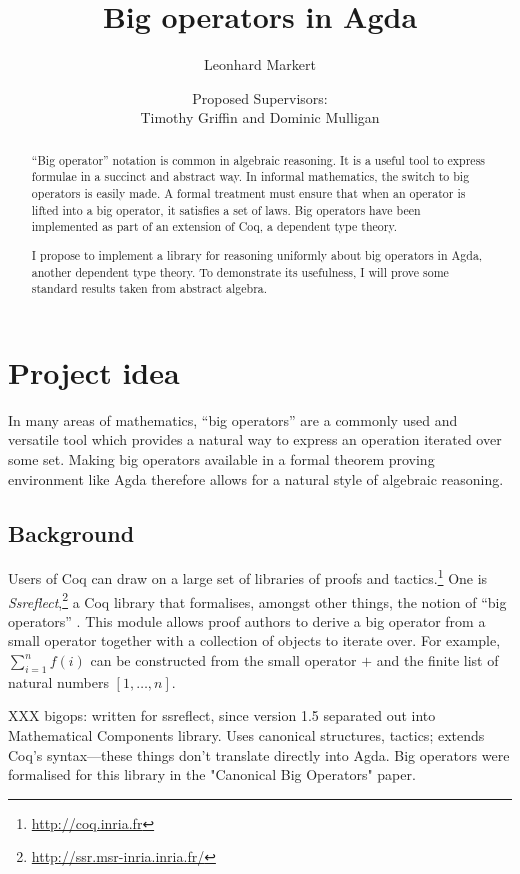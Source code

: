\documentclass[a4paper]{scrartcl}
\title{Big operators in Agda}
\author{Leonhard Markert}
\date{Proposed Supervisors:\\Timothy Griffin and Dominic Mulligan}
\begin{document}
\maketitle

\begin{abstract}
\enquote{Big operator} notation is common in algebraic reasoning.
It is a useful tool to express formulae in a succinct and abstract way.
In informal mathematics, the switch to big operators is easily made.
A formal treatment must ensure that when an operator is lifted into a big operator, it satisfies a set of laws.
Big operators have been implemented as part of an extension of Coq, a dependent type theory.

I propose to implement a library for reasoning uniformly about big operators in Agda, another dependent type theory.
To demonstrate its usefulness, I will prove some standard results taken from abstract algebra.
\end{abstract}

\section{Project idea}
\label{project-idea}

In many areas of mathematics, \enquote{big operators} are a commonly used and versatile tool which provides a natural way to express an operation iterated over some set. Making big operators available in a formal theorem proving environment like Agda therefore allows for a natural style of algebraic reasoning.

\subsection{Background}

Users of Coq can draw on a large set of libraries of proofs and tactics.\footnote{\url{http://coq.inria.fr}}
One is \emph{Ssreflect},\footnote{\url{http://ssr.msr-inria.inria.fr/}} a Coq library that formalises, amongst other things, the notion of \enquote{big operators} \autocite{bertot_canonical_2008}.
This module allows proof authors to derive a big operator from a small operator together with a collection of objects to iterate over.
For example, \(\sum_{i=1}^n f(i)\) can be constructed from the small operator \(+\) and the finite list of natural numbers \([1, \dots, n]\).

XXX bigops: written for ssreflect, since version 1.5 separated out into Mathematical Components library. Uses canonical structures, tactics; extends Coq's syntax---these things don't translate directly into Agda. Big operators were formalised for this library in the "Canonical Big Operators" paper.
\end{document}

